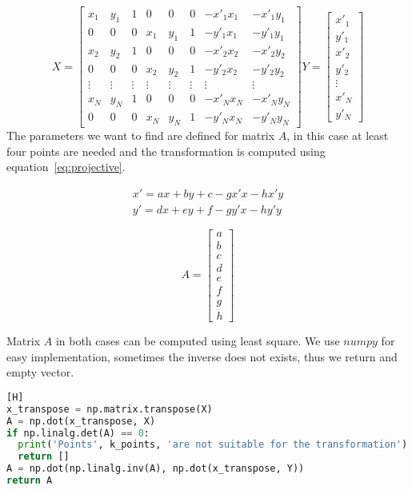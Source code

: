 \begin{itemize}
\[
X = 
\begin{bmatrix}
    x_{1}       & y_{1} & 1 & 0 & 0 & 0 & -x'_1x_1 & -x'_1y_1\\
    0       & 0 & 0 & x_1 & y_1 & 1 & -y'_1x_1 & -y'_1y_1\\
    x_{2}       & y_{2} & 1 & 0 & 0 & 0 & -x'_2x_2 & -x'_2y_2\\
    0       & 0 & 0 & x_2 & y_2 & 1 & -y'_2x_2 & -y'_2y_2 \\
  \vdots & \vdots & \vdots & \vdots & \vdots & \vdots & \vdots & \vdots \\

    x_{N}       & y_{N} & 1 & 0 & 0 & 0 & -x'_Nx_N & -x'_Ny_N\\
    0       & 0 & 0 & x_N & y_N & 1 & -y'_Nx_N & -y'_Ny_N 
\end{bmatrix}
%
Y = 
\begin{bmatrix}
    x'_{1} \\
    y'_{1} \\
    x'_{2}      \\
    y'_{2}   \\
 \vdots \\
    x'_{N}      \\
    y'_{N}   
\end{bmatrix}
\]
The parameters we want to find are defined for matrix $A$, in this case at least four points are needed and the transformation is computed using equation~\ref{eq:projective}.

\begin{equation}
\begin{split}
x'= ax+by+c-gx'x-hx'y\\
y'= dx+ey+f -gy'x-hy'y 
\end{split}
\label{eq:projective}
\end{equation}

\[
A = 
\begin{bmatrix}
    a \\
    b \\
    c      \\
    d   \\ 
    e      \\
    f   \\
    g\\
    h
\end{bmatrix}
\]

Matrix $A$ in both cases can be computed using least square. We use $numpy$ for easy implementation, sometimes the inverse does not exists, thus we return and empty vector.
\begin{lstlisting}[language=python][H]
x_transpose = np.matrix.transpose(X)
A = np.dot(x_transpose, X)
if np.linalg.det(A) == 0:
  print('Points', k_points, 'are not suitable for the transformation')
  return []
A = np.dot(np.linalg.inv(A), np.dot(x_transpose, Y))
return A
\end{lstlisting}


\end{itemize}

